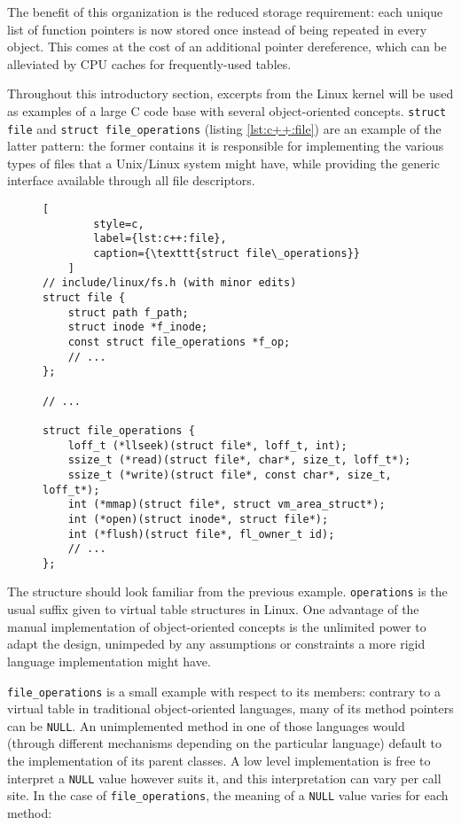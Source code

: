 The benefit of this organization is the reduced storage requirement: each unique
list of function pointers is now stored once instead of being repeated in every
object.  This comes at the cost of an additional pointer dereference, which can
be alleviated by CPU caches for frequently-used tables.

Throughout this introductory section, excerpts from the Linux kernel will be
used as examples of a large C code base with several object-oriented
concepts\footnotemark.  \texttt{struct file} and \texttt{struct
file\_operations} (listing \ref{lst:c++:file}) are an example of the latter
pattern: the former contains it is responsible for implementing the various
types of files that a Unix/Linux system might have, while providing the generic
interface available through all file descriptors.


\begin{figure}[ht]
    \begin{lstlisting}[
        style=c,
        label={lst:c++:file},
        caption={\texttt{struct file\_operations}}
    ]
// include/linux/fs.h (with minor edits)
struct file {
    struct path f_path;
    struct inode *f_inode;
    const struct file_operations *f_op;
    // ...
};

// ...

struct file_operations {
    loff_t (*llseek)(struct file*, loff_t, int);
    ssize_t (*read)(struct file*, char*, size_t, loff_t*);
    ssize_t (*write)(struct file*, const char*, size_t, loff_t*);
    int (*mmap)(struct file*, struct vm_area_struct*);
    int (*open)(struct inode*, struct file*);
    int (*flush)(struct file*, fl_owner_t id);
    // ...
};
    \end{lstlisting}
\end{figure}

The structure should look familiar from the previous example.
\texttt{operations} is the usual suffix given to virtual table structures in
Linux.  One advantage of the manual implementation of object-oriented concepts
is the unlimited power to adapt the design, unimpeded by any assumptions or
constraints a more rigid language implementation might have.

\texttt{file\_operations} is a small example with respect to its members:
contrary to a virtual table in traditional object-oriented languages, many of
its method pointers can be \texttt{NULL}.  An unimplemented method in one of
those languages would (through different mechanisms depending on the particular
language) default to the implementation of its parent classes.  A low level
implementation is free to interpret a \texttt{NULL} value however suits it, and
this interpretation can vary per call site.  In the case of
\texttt{file\_operations}, the meaning of a \texttt{NULL} value varies for each
method:

